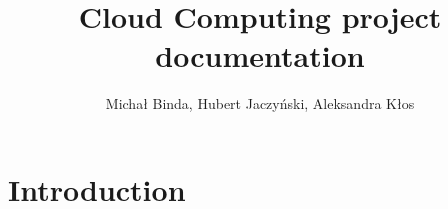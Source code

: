 \documentclass{article}
\title{Cloud Computing project documentation}
\author{Michał Binda, Hubert Jaczyński, Aleksandra Kłos}
\begin{document}
\maketitle

\section{Introduction}
\end{document}

